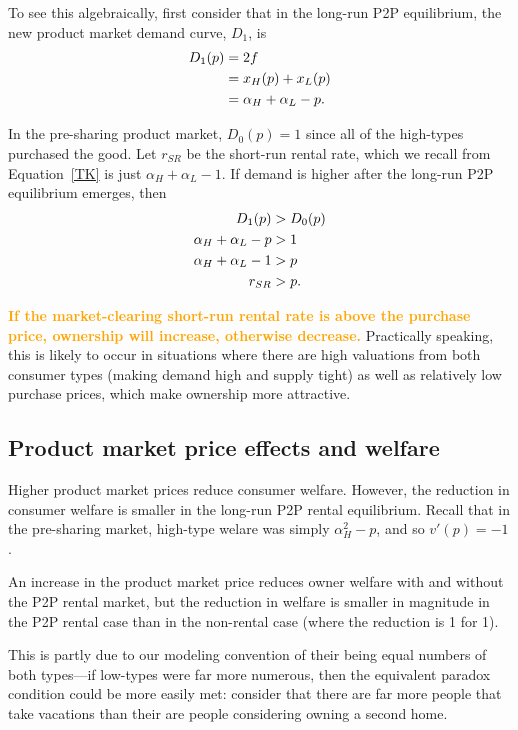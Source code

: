\documentclass[11pt]{article}
\newcommand{\important}[1]{\textcolor{orange}{\textbf{#1}}}
\begin{document}
To see this algebraically, first consider that in the long-run P2P equilibrium, the new product market demand curve, $D_1$, is
\begin{align}
D_1(p) &= 2f \notag \\  
     &= x_H(p) + x_L(p) \notag \\ 
     &= \alpha_H + \alpha_L - p.  
\end{align} 

In the pre-sharing product market, $D_0(p) = 1$ since all of the high-types purchased the good. 
Let $r_{SR}$ be the short-run rental rate, which we recall from Equation~\ref{TK} is just $\alpha_H + \alpha_L - 1$. 
If demand is higher after the long-run P2P equilibrium emerges, then  
\begin{align} 
D_{1}(p) & > D_{0}(p) \notag \\
\alpha_H + \alpha_L - p &> 1 \notag \\ 
\alpha_H + \alpha_L - 1 &> p \notag \\ 
r_{SR} &>  p. 
\end{align} 

\important{If the market-clearing short-run rental rate is above the purchase price, ownership will increase, otherwise decrease.}
Practically speaking, this is likely to occur in situations where there are high valuations from both consumer types (making demand high and supply tight) as well as relatively low purchase prices, which make ownership more attractive. 

\subsection{Product market price effects and welfare} 

Higher product market prices reduce consumer welfare. 
However, the reduction in consumer welfare is smaller in the long-run P2P rental equilibrium. 
Recall that in the pre-sharing market, high-type welare was simply $\alpha_H^2 - p$, and so $v'(p) = -1$. 


An increase in the product market price reduces owner welfare with and without the P2P rental market, but the reduction in welfare is smaller in magnitude in the P2P rental case than in the non-rental case (where the reduction is 1 for 1). 



This is partly due to our modeling convention of their being equal numbers of both types---if low-types were far more numerous, then the equivalent paradox condition could be more easily met: 
consider that there are far more people that take vacations than their are people considering owning a second home.  
\end{document}
